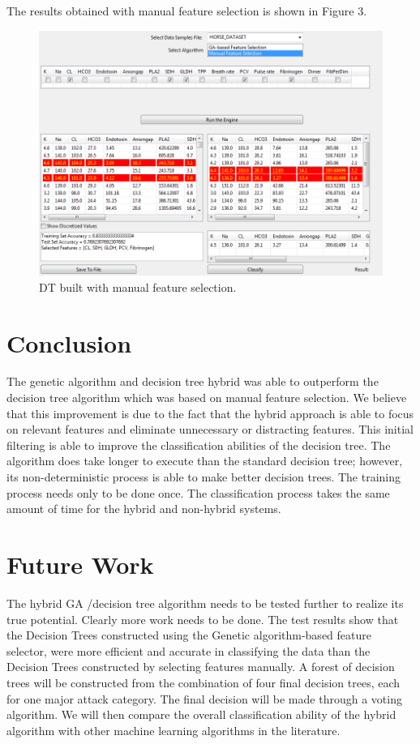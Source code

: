 \documentclass[conference]{IEEEtran}
\begin{document}
The results obtained with manual feature selection is shown in Figure 3.
\begin{figure}[h!]
  
  \centering
    \includegraphics[scale=0.3]{manual_sel_stats.png}
\caption{DT built with manual feature selection.}
\end{figure}
\section{Conclusion}
The genetic algorithm and decision tree hybrid was able to
outperform the decision tree algorithm which was based on manual feature selection.
We believe that this improvement is due to the fact that the
hybrid approach is able to focus on relevant features and
eliminate unnecessary or distracting features. This initial filtering
is able to improve the classification abilities of the decision tree.
The algorithm does take longer to execute than the standard
decision tree; however, its non-deterministic process is able to
make better decision trees. The training process needs only to be
done once. The classification process takes the same amount of
time for the hybrid and non-hybrid systems.

\section{Future Work}
The hybrid GA /decision tree algorithm needs to be tested
further to realize its true potential. Clearly more work needs to be done. 
The test results show that the Decision Trees constructed using the Genetic algorithm-based feature selector, were more efficient and accurate in classifying the data than the Decision Trees constructed by selecting features manually. A forest of decision trees will be
constructed from the combination of four final decision trees,
each for one major attack category. The final decision will be
made through a voting algorithm. We will then compare the
overall classification ability of the hybrid algorithm with other
machine learning algorithms in the literature.
\end{document}
